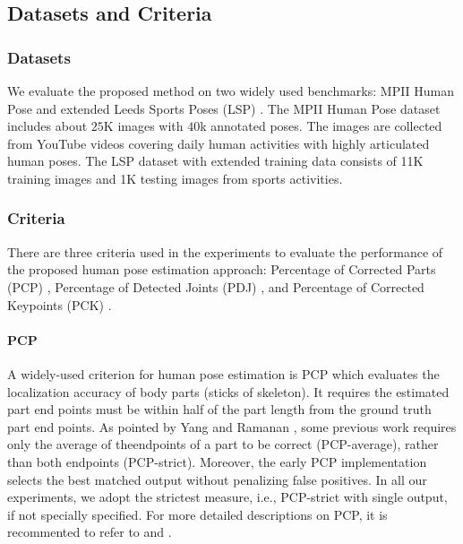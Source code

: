 \documentclass[journal ]{IEEEtran}
\begin{document}
\label{sec:experiments}
\subsection{Datasets and Criteria}
\subsubsection{Datasets}
We evaluate the proposed method on two widely used benchmarks: MPII Human Pose \cite{andriluka20142d} and extended Leeds Sports Poses (LSP) \cite{johnson2010clustered}. The MPII Human Pose dataset includes about $25$K images with $40$k annotated poses. The images are collected from YouTube videos covering daily human activities with highly articulated human poses. The LSP dataset with extended training data consists of 11K training images and 1K testing images from sports activities.

\subsubsection{Criteria}
There are three criteria used in the experiments to evaluate the performance of the proposed human pose estimation approach: Percentage of Corrected Parts (PCP) \cite{yang2013articulated, ferrari2008progressive, eichner20122d}, Percentage of Detected Joints (PDJ) \cite{toshev2014deeppose, sapp2013modec, yang2013articulated}, and Percentage of Corrected Keypoints (PCK) \cite{yang2013articulated}.

\paragraph{PCP}
A widely-used criterion for human pose estimation is PCP which evaluates the localization accuracy of body parts (sticks of skeleton). It requires the estimated part end points must be within half of the part length from the ground truth part end points. As pointed by Yang and Ramanan \cite{yang2013articulated}, some previous work requires only the average of theendpoints of a part to be correct (PCP-average), rather than both endpoints (PCP-strict). Moreover, the early PCP implementation \cite{ferrari2008progressive} selects the best matched output without penalizing false positives. In all our experiments, we adopt the strictest measure, i.e., PCP-strict with single output, if not specially specified. For more detailed descriptions on PCP, it is recommented to refer to \cite{ferrari2008progressive} and \cite{yang2013articulated}.
\end{document}
